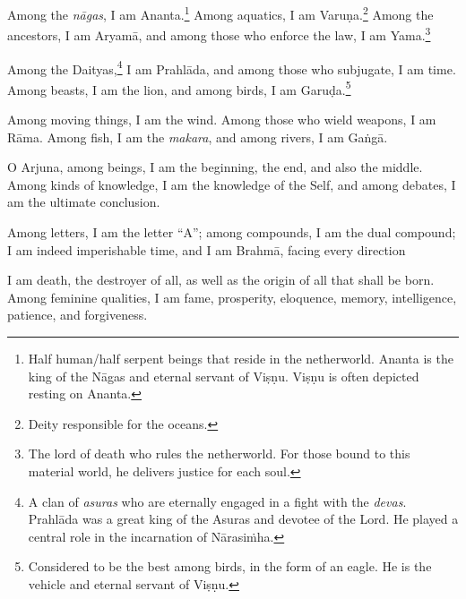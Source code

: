 {Among the \textit{nāgas}, I am Ananta.\footnote{Half human/half serpent beings that reside in the netherworld. Ananta is the king of the Nāgas and eternal servant of Viṣṇu. Viṣṇu is often depicted resting on Ananta.} Among aquatics, I am Varuṇa.\footnote{Deity responsible for the oceans.} Among the ancestors, I am Aryamā, and among those who enforce the law, I am Yama.\footnote{The lord of death who rules the netherworld. For those bound to this material world, he delivers justice for each soul.}}

{Among the Daityas,\footnote{A clan of \textit{asuras} who are eternally engaged in a fight with the \textit{devas}. Prahlāda was a great king of the Asuras and devotee of the Lord. He played a central role in the incarnation of Nārasiṁha.} I am Prahlāda, and among those who subjugate, I am time. Among beasts, I am the lion, and among birds, I am Garuḍa.\footnote{Considered to be the best among birds, in the form of an eagle. He is the vehicle and eternal servant of Viṣṇu.}}

{Among moving things, I am the wind. Among those who wield weapons, I am Rāma. Among fish, I am the \textit{makara}, and among rivers, I am Gaṅgā.}

{O Arjuna, among beings, I am the beginning, the end, and also the middle. Among kinds of knowledge, I am the knowledge of the Self, and among debates, I am the ultimate conclusion.}

{Among letters, I am the letter \enquote{A}; among compounds, I am the dual compound; I am indeed imperishable time, and I am Brahmā, facing every direction}

{I am death, the destroyer of all, as well as the origin of all that shall be born. Among feminine qualities, I am fame, prosperity, eloquence, memory, intelligence, patience, and forgiveness.}

